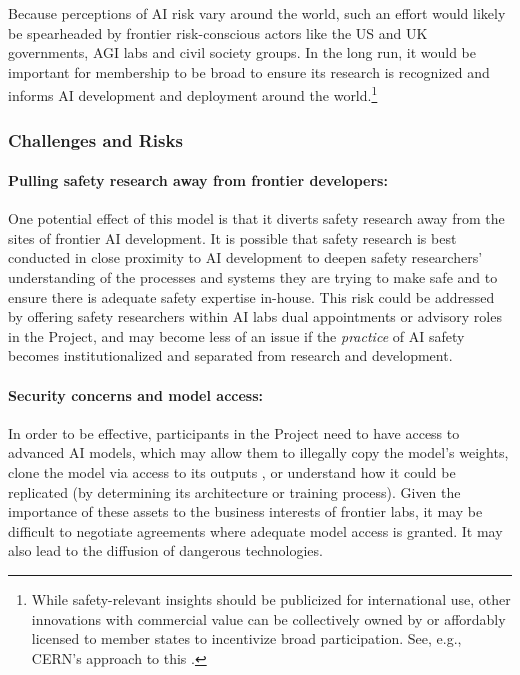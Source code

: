 \documentclass[12pt]{article}
\begin{document}
Because perceptions of AI risk vary around the world, such an effort
would likely be spearheaded by frontier risk-conscious actors like the
US and UK governments, AGI labs and civil society groups. In the long
run, it would be important for membership to be broad to ensure its
research is recognized and informs AI development and deployment around
the world.\footnote{While safety-relevant insights should be publicized
  for international use, other innovations with commercial value can be
  collectively owned by or affordably licensed to member states to
  incentivize broad participation. See, e.g., CERN's approach to this
  \cite{le_gall_how_2021}.}


\subsubsection*{Challenges and Risks}

\paragraph{Pulling safety research away from frontier developers:} One potential
effect of this model is that it diverts safety research away from the
sites of frontier AI development. It is possible that safety research
is best conducted in close proximity to AI development to deepen safety
researchers' understanding of the processes and systems they are trying
to make safe and to ensure there is adequate safety expertise in-house.
This risk could be addressed by offering safety researchers within AI
labs dual appointments or advisory roles in the Project, and may become
less of an issue if the \emph{practice} of AI safety becomes
institutionalized and separated from research and development.

\paragraph{Security concerns and model access:} In order to be effective,
participants in the Project need to have access to advanced AI models,
which may allow them to illegally copy the model's weights, clone the
model via access to its outputs \cite{taori_alpaca_2023},
or understand how it could be replicated (by determining its
architecture or training process). Given the importance of these assets
to the business interests of frontier labs, it may be difficult to
negotiate agreements where adequate model access is granted. It may also
lead to the diffusion of dangerous technologies.
\end{document}
